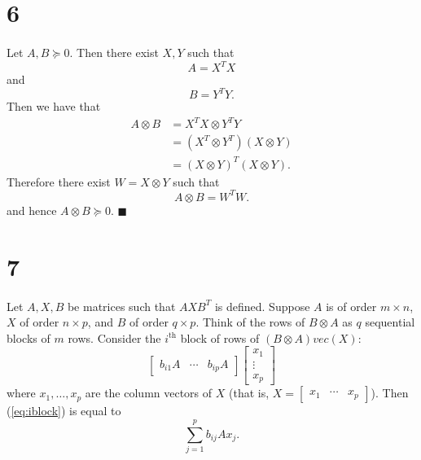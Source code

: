 \documentclass[letterpaper,12pt,oneside,onecolumn]{article}
\begin{document}
\section*{6}
\paragraph{}
Let $A, B \succcurlyeq 0$. Then there exist $X, Y$ such that $$A = X^TX$$ and $$B = Y^TY.$$
Then we have that
\begin{align*}
A \otimes B &= X^TX \otimes Y^TY \\
&= (X^T \otimes Y^T)(X \otimes Y) \\
&= (X \otimes Y)^T(X \otimes Y).
\end{align*}
Therefore  there exist $W = X \otimes Y$ such that $$A \otimes B = W^TW.$$
and hence $A \otimes B \succcurlyeq 0$. $\blacksquare$
\section*{7}
\paragraph{}
Let $A, X, B$ be matrices such that $AXB^T$ is defined. Suppose $A$ is  of order $m \times n$, $X$ of order $n \times p$, and $B$ of order $q \times p$. Think of the rows of $B \otimes A$ as $q$ sequential blocks of $m$ rows. Consider the $i^\text{th}$ block of rows of $(B \otimes A)vec(X)$:
\begin{equation}\begin{bmatrix} b_{i1} A & \cdots & b_{ip}A \end{bmatrix}
\begin{bmatrix}
x_1 \\ \vdots \\ x_p
\end{bmatrix} \label{eq:iblock}\end{equation}
where $x_1, \dots, x_p$ are the column vectors of $X$ (that is, $X = \begin{bmatrix} x_1 & \cdots & x_p\end{bmatrix}$). Then (\ref{eq:iblock}) is equal to
\begin{equation} \sum_{j=1}^p b_{ij}Ax_j.  \label{eq:tensorsum}\end{equation}
\end{document}
